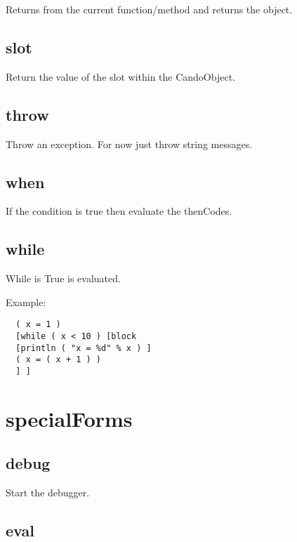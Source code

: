 \begin{itemize}
  Returns from the current function/method and returns the object.

\subsection{slot}
  \par

  Return the value of the slot within the CandoObject.

\subsection{throw}

  Throw an exception. For now just throw string messages.

\subsection{when}
  \par

  If the condition is true then evaluate the thenCodes.

\subsection{while}

  While  is True  is evaluated.

  Example:
  \begin{verbatim}
  ( x = 1 )
  [while ( x < 10 ) [block
  [println ( "x = %d" % x ) ]
  ( x = ( x + 1 ) )
  ] ]
  \end{verbatim}

\section{specialForms}
\subsection{debug}

  Start the debugger.

\subsection{eval}


\end{itemize}
